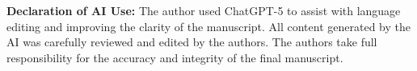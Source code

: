 \documentclass{article}
\begin{document}



\vfill
{\footnotesize
	\noindent\textbf{Declaration of AI Use:} The author used ChatGPT-5 to
	assist with language editing and improving the clarity of the manuscript.
	All content generated by the AI was carefully reviewed and edited by the
	authors. The authors take full responsibility for the accuracy and integrity
	of the final manuscript.
	\par}
\end{document}
